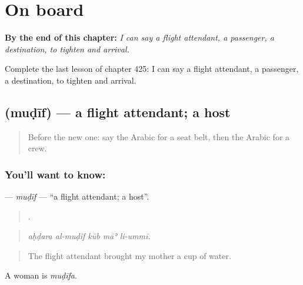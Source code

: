 
\chapter{On board}
\label{ch:ar-on-board}

\begin{chapteropening}
\textbf{By the end of this chapter:} \emph{I can say a flight attendant, a passenger, a destination, to tighten and arrival.}

Complete the last lesson of chapter 425: I can say a flight attendant, a passenger, a destination, to tighten and arrival.
\end{chapteropening}

\section[\texorpdfstring{\ar{مضيف} (muḍīf)}{مضيف (muḍīf)}]{ (muḍīf) — a flight attendant; a host}

\label{lesson:AR-C425-mudif}



\begin{quote}
Before the new one: say the Arabic for a seat belt, then the Arabic for a crew.
\end{quote}

\subsection*{You'll want to know: }
\textbf{} — \emph{muḍīf} — \textquotedblleft{}a flight attendant; a host\textquotedblright{}.

\begin{quote}
    .
\end{quote}

\begin{quote}
\emph{aḥḍara al-muḍīf kūb māʾ li-ummī.}
\end{quote}

\begin{quote}
The flight attendant brought my mother a cup of water.
\end{quote}

A woman is \emph{muḍīfa}.

